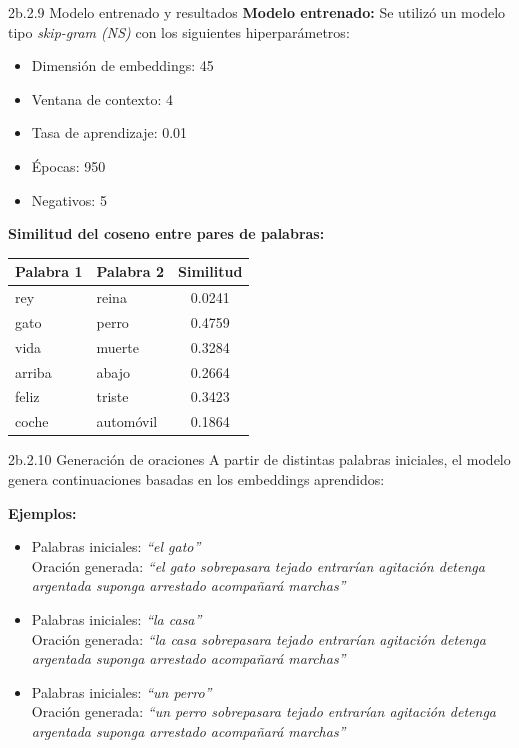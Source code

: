\documentclass{beamer}
\begin{document}
\begin{frame}{2b.2.9 Modelo entrenado y resultados}
	\justifying
	\textbf{Modelo entrenado:} Se utilizó un modelo tipo \textit{skip-gram (NS)} con los siguientes hiperparámetros:
	\begin{itemize}
		\item Dimensión de embeddings: 45
		\item Ventana de contexto: 4
		\item Tasa de aprendizaje: 0.01
		\item Épocas: 950
		\item Negativos: 5
	\end{itemize}
	
	\vspace{0.3cm}
	\textbf{Similitud del coseno entre pares de palabras:}
	\begin{table}[]
		\centering
		\begin{tabular}{l l c}
			\hline
			Palabra 1 & Palabra 2 & Similitud \\
			\hline
			rey     & reina     & 0.0241 \\
			gato    & perro     & 0.4759 \\
			vida    & muerte    & 0.3284 \\
			arriba  & abajo     & 0.2664 \\
			feliz   & triste    & 0.3423 \\
			coche   & automóvil & 0.1864 \\
			\hline
		\end{tabular}
	\end{table}
	
\end{frame}


\begin{frame}{2b.2.10 Generación de oraciones}
	\justifying
	A partir de distintas palabras iniciales, el modelo genera continuaciones basadas en los embeddings aprendidos:
	
	\vspace{0.3cm}
	\textbf{Ejemplos:}
	\begin{itemize}
		\item Palabras iniciales: \textit{``el gato''} \\
		Oración generada: \textit{``el gato sobrepasara tejado entrarían agitación detenga argentada suponga arrestado acompañará marchas''}
		\item Palabras iniciales: \textit{``la casa''} \\
		Oración generada: \textit{``la casa sobrepasara tejado entrarían agitación detenga argentada suponga arrestado acompañará marchas''}
		\item Palabras iniciales: \textit{``un perro''} \\
		Oración generada: \textit{``un perro sobrepasara tejado entrarían agitación detenga argentada suponga arrestado acompañará marchas''}
	\end{itemize}
\end{frame}
\end{document}
